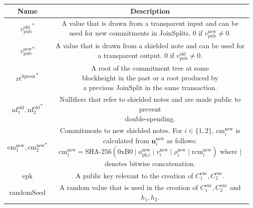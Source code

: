 \documentclass{article}
\begin{document}
\begin{center}
\begin{table}
{\tiny
\begin{tabular}{ |c|c| } 
        \hline
        \textbf{Name} & \textbf{Description} \\
        \hline
        \rule{0pt}{4ex} {\small ${v_\text{pub}^\text{old}}^\ast$} & \makecell{A value that is drawn from a transparent input and can be used\\ for new commitments in JoinSplits. $0$ if $v_\text{pub}^\text{new} \neq 0$.} \\
        \hline
        \rule{0pt}{4ex} {\small ${v_\text{pub}^\text{new}}^\ast$} & \makecell{A value that is drawn from a shielded note and can be used for\\ a transparent output. $0$ if $v_\text{pub}^\text{old} \neq 0$.} \\
        \hline
        \rule{0pt}{4ex} {\small ${\text{rt}^\text{Sprout}}^\ast$} & \makecell{A root of the commitment tree at some \\ blockheight in the past or a root produced by\\ a previous JoinSplit in the same transaction.} \\
        \hline
        \rule{0pt}{4ex} {\small $\text{nf}_1^\text{old}, {\text{nf}_2^\text{old}}^\ast$} & \makecell{Nullifiers that refer to shielded notes and are made public to prevent\\ double-spending.} \\
        \hline
        \rule{0pt}{4ex} {\small $\text{cm}_1^\text{new}, {\text{cm}_2^\text{new}}^\ast$} & \makecell{Commitments to new shielded notes. For $i \in \{1,2\}$,\\ $\text{cm}_i^\text{new}$ is calculated from $\boldsymbol{n}^\text{new}_i$ as follows:\\$\text{cm}_i^\text{new} = \text{SHA-256}(\text{0xB0} \mid a_\text{pk,$i$}^\text{new} \mid v_i^\text{new} \mid \rho_i^\text{new} \mid \text{rcm}_i^\text{new})$\\ where $\mid$ denotes bitwise concatenation.} \\
        \hline
        \rule{0pt}{4ex} {\small epk} & A public key relevant to the creation of $C_1^\text{enc}, C_2^\text{enc}$. \\
        \hline
        \rule{0pt}{4ex} {\small randomSeed} & \makecell{A random value that is used in the creation of $C_1^\text{enc}, C_2^\text{enc}$ and\\ $h_1, h_2$.} \\

\end{tabular}}
\end{table}
\end{center}
\end{document}
